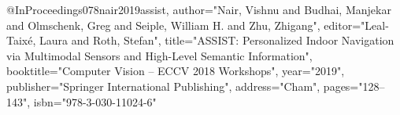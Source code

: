 @InProceedings{078nair2019assist,
author="Nair, Vishnu
and Budhai, Manjekar
and Olmschenk, Greg
and Seiple, William H.
and Zhu, Zhigang",
editor="Leal-Taix{\'e}, Laura
and Roth, Stefan",
title="ASSIST: Personalized Indoor Navigation via Multimodal Sensors and High-Level Semantic Information",
booktitle="Computer Vision -- ECCV 2018 Workshops",
year="2019",
publisher="Springer International Publishing",
address="Cham",
pages="128--143",
isbn="978-3-030-11024-6"
}